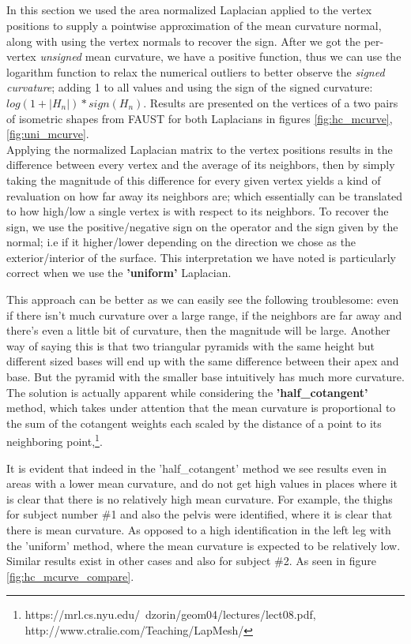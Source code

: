 \subsection{}\label{subsec:mcurve}
In this section we used the area normalized Laplacian applied to the vertex positions to supply a pointwise approximation of the mean curvature normal, along with using the vertex normals to recover the sign. After we got the per-vertex \emph{unsigned} mean curvature, we have a positive function, thus we can use the logarithm function to relax the numerical outliers to better observe the \emph{signed curvature}; adding 1 to all values and using the sign of the signed curvature: $log(1+|H_n|)*sign(H_n)$. Results are presented on the vertices of a two pairs of isometric shapes from FAUST for both Laplacians in figures \ref{fig:hc_mcurve}, \ref{fig:uni_mcurve}. \\

Applying the normalized Laplacian matrix to the vertex positions results in the difference between every vertex and the average of its neighbors, then by simply taking the magnitude of this difference for every given vertex yields a kind of revaluation on how far away its neighbors are; which essentially can be translated to how high/low a single vertex is with respect to its neighbors. To recover the sign, we use the positive/negative sign on the operator and the sign given by the normal; i.e if it higher/lower depending on the direction we chose as the exterior/interior of the surface. This interpretation we have noted is particularly correct when we use the \textbf{'uniform'} Laplacian.

This approach can be better as we can easily see the following troublesome: even if there isn't much curvature over a large range, if the neighbors are far away and there's even a little bit of curvature, then the magnitude will be large. Another way of saying this is that two triangular pyramids with the same height but different sized bases will end up with the same difference between their apex and base. But the pyramid with the smaller base intuitively has much more curvature. The solution is actually apparent while considering the \textbf{'half\_cotangent'} method, which takes under attention that the mean curvature is proportional to the sum of the cotangent weights each scaled by the distance of a point to its neighboring point,\footnote{https://mrl.cs.nyu.edu/~dzorin/geom04/lectures/lect08.pdf, http://www.ctralie.com/Teaching/LapMesh/}.

It is evident that indeed in the 'half\_cotangent' method we see results even in areas with a lower mean curvature, and do not get high values in places where it is clear that there is no relatively high mean curvature. For example, the thighs for subject number \#1 and also the pelvis were identified, where it is clear that there is mean curvature. As opposed to a high identification in the left leg with the 'uniform' method, where the mean curvature is expected to be relatively low. Similar results exist in other cases and also for subject \#2. As seen in figure \ref{fig:hc_mcurve_compare}.

